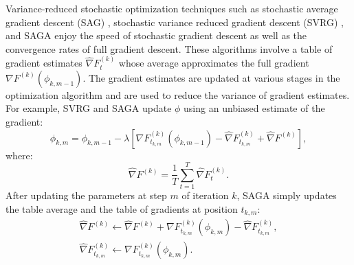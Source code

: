Variance-reduced stochastic optimization techniques such as stochastic average gradient descent (SAG) \citep{Schmidt:2017}, stochastic variance reduced gradient descent (SVRG) \citep{Johnson:2013}, and SAGA \citep{Defazio:2014} enjoy the speed of stochastic gradient descent as well as the convergence rates of full gradient descent. These algorithms involve a table of gradient estimates $\widehat \nabla F^{(k)}_t$ whose average approximates the full gradient $\nabla F^{(k)}(\phi_{k,m-1})$. The gradient estimates are updated at various stages in the optimization algorithm and are used to reduce the variance of gradient estimates. 
%
%
For example, SVRG and SAGA update $\phi$ using an unbiased estimate of the gradient:
%
\begin{equation}
    \phi_{k,m} = \phi_{k,m-1} - \lambda \left[\nabla F^{(k)}_{t_{k,m}}(\phi_{k,m-1}) - \widehat \nabla F^{(k)}_{t_{k,m}} + \widehat \nabla F^{(k)} \right],
    \label{eqn:SAGA_update}
\end{equation}
%
where:
%
\begin{equation}
    \widehat \nabla F^{(k)} = \frac{1}{T} \sum_{t=1}^T \widehat \nabla F^{(k)}_{t}.
    \label{eqn:tbl_avg}
\end{equation}
%
%
After updating the parameters at step $m$ of iteration $k$, SAGA simply updates the table average and the table of gradients at position $t_{k,m}$: 
%
\begin{gather}
    \widehat \nabla F^{(k)} \gets \widehat \nabla F^{(k)} + \nabla F^{(k)}_{t_{k,m}}(\phi_{k,m}) - \widehat \nabla F^{(k)}_{t_{k,m}}, \\
    \widehat \nabla F^{(k)}_{t_{k,m}} \gets \nabla F^{(k)}_{t_{k,m}}(\phi_{k,m}).
\end{gather}
%

